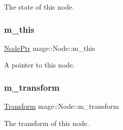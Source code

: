 The state of this node. \mbox{\label{classmage_1_1_node_ab056e1563dca22433efa152f4b6da46f}} 
\subsubsection{\texorpdfstring{m\+\_\+this}{m\_this}}
{\footnotesize\ttfamily \mbox{\hyperlink{classmage_1_1_node_ac575dc006e0ae1134277ade977dc06b6}{Node\+Ptr}} mage\+::\+Node\+::m\+\_\+this\hspace{0.3cm}{\ttfamily [private]}}

A pointer to this node. \mbox{\label{classmage_1_1_node_a0f4dd0c46d9713fd64b0e562862afac6}} 
\subsubsection{\texorpdfstring{m\+\_\+transform}{m\_transform}}
{\footnotesize\ttfamily \mbox{\hyperlink{classmage_1_1_transform}{Transform}} mage\+::\+Node\+::m\+\_\+transform\hspace{0.3cm}{\ttfamily [private]}}

The transform of this node. 